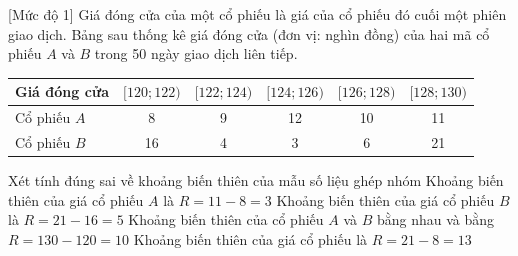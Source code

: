 \begin{ex}%
[Mức độ 1]
	Giá đóng cửa của một cổ phiếu là giá của cổ phiếu đó cuối một phiên giao dịch. Bảng sau thống kê giá đóng cửa (đơn vị: nghìn đồng) của hai mã cổ phiếu $A$ và $B$ trong 50 ngày giao dịch liên tiếp.
	\begin{center}
		\begin{tabular}{|l|c|c|c|c|c|}
			\hline Giá đóng cửa & $[120 ; 122)$ & {$[122 ; 124)$} & {$[124 ; 126)$} & {$[126 ; 128)$} & {$[128 ; 130)$} \\
			\hline Cổ phiếu $A$ & 8 & 9 & 12 & 10 & 11 \\
			\hline Cổ phiếu $B$ & 16 & 4 & 3 & 6 & 21 \\
			\hline
		\end{tabular}
	\end{center}
	Xét tính đúng sai về khoảng biến thiên của mẫu số liệu ghép nhóm
	\choiceTF
	{ Khoảng biến thiên của giá cổ phiếu $A$ là $R=11-8=3$}
	{ Khoảng biến thiên của giá cổ phiếu $B$ là $R=21-16=5$}
	{\True Khoảng biến thiên của cổ phiếu $A$ và $B$ bằng nhau và bằng $R=130-120=10$}
	{ Khoảng biến thiên của giá cổ phiếu là $R=21-8=13$}
\end{ex}

